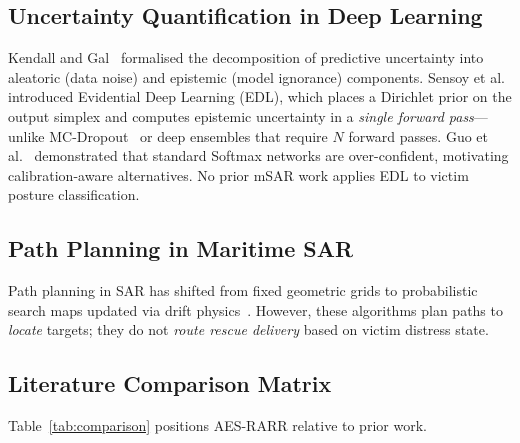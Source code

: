 \documentclass[11pt,a4paper]{article}
\begin{document}
\subsection{Uncertainty Quantification in Deep Learning}

Kendall and Gal~\cite{kendall2017} formalised the decomposition of
predictive uncertainty into aleatoric (data noise) and epistemic (model
ignorance) components.
Sensoy et al.~\cite{sensoy2018} introduced Evidential Deep Learning (EDL),
which places a Dirichlet prior on the output simplex and computes epistemic
uncertainty in a \emph{single forward pass}---unlike MC-Dropout~\cite{gal2016}
or deep ensembles that require $N$ forward passes.
Guo et al.~\cite{guo2017} demonstrated that standard Softmax networks are
over-confident, motivating calibration-aware alternatives.
No prior mSAR work applies EDL to victim posture classification.

\subsection{Path Planning in Maritime SAR}

Path planning in SAR has shifted from fixed geometric grids to probabilistic
search maps updated via drift physics~\cite{ref12}.
However, these algorithms plan paths to \emph{locate} targets; they do not
\emph{route rescue delivery} based on victim distress state.

\subsection{Literature Comparison Matrix}

Table~\ref{tab:comparison} positions AES-RARR relative to prior work.
\end{document}
